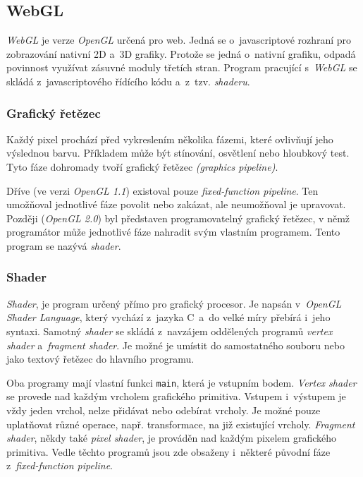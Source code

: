 \documentclass[a4paper,12pt]{article}
\def\code#1{\texttt{#1}}
\begin{document}
\subsection{WebGL}

\textit{WebGL} je verze \textit{OpenGL} určená pro web. Jedná se o~javascriptové rozhraní pro zobrazování nativní 2D a~3D grafiky. Protože se jedná o~nativní grafiku, odpadá povinnost využívat zásuvné moduly třetích stran. Program pracující s~\textit{WebGL} se skládá z~javascriptového řídícího kódu a~z~tzv. \textit{shaderu}.~\cite{graphic}

\subsubsection{Grafický řetězec}

Každý pixel prochází před vykreslením několika fázemi, které ovlivňují jeho výslednou barvu. Příkladem může být stínování, osvětlení nebo hloubkový test. Tyto fáze dohromady tvoří grafický řetězec \textit{(graphics pipeline)}.~\cite{graphic}

Dříve (ve verzi \textit{OpenGL 1.1}) existoval pouze \textit{fixed-function pipeline}. Ten umožňoval jednotlivé fáze povolit nebo zakázat, ale neumožňoval je upravovat. Později (\textit{OpenGL 2.0}) byl představen programovatelný grafický řetězec, v němž programátor může jednotlivé fáze nahradit svým vlastním programem. Tento program se nazývá \textit{shader}.~\cite{graphic}

\subsubsection{Shader}

\textit{Shader}, je program určený přímo pro grafický procesor. Je napsán v~\textit{OpenGL Shader Language}, který vychází z~jazyka C~a~do velké míry přebírá i~jeho syntaxi. Samotný \textit{shader} se skládá z~navzájem oddělených programů \textit{vertex shader} a~\textit{fragment shader}. Je možné je umístit do samostatného souboru nebo jako textový řetězec do hlavního programu.~\cite{graphic}

Oba programy mají vlastní funkci \code{main}, která je vstupním bodem. \textit{Vertex shader} se provede nad každým vrcholem grafického primitiva. Vstupem i~výstupem je vždy jeden vrchol, nelze přidávat nebo odebírat vrcholy. Je možné pouze uplatňovat různé operace, např. transformace, na již existující vrcholy. \textit{Fragment shader}, někdy také \textit{pixel shader}, je prováděn nad každým pixelem grafického primitiva. Vedle těchto programů jsou zde obsaženy i~některé původní fáze z~\textit{fixed-function pipeline}.~\cite{graphic}
\end{document}
